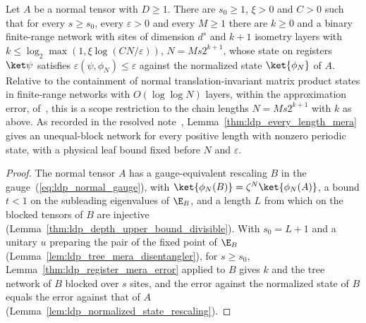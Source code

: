 \begin{lemma}
    \label{thm:ldp_normal_mps_mera}
    \leanok
    Let $A$ be a normal tensor with $D\ge1$. There are $s_0\ge1$, $\xi>0$
    and $C>0$ such that for every $s\ge s_0$, every $\varepsilon>0$ and every
    $M\ge1$ there are $k\ge0$ and a binary finite-range network with sites of
    dimension $d^s$ and $k+1$ isometry layers with
    $k\le\log_2\max(1,\xi\log(CN/\varepsilon))$, $N=Ms2^{k+1}$, whose state
    on registers $\ket\psi$ satisfies $\varepsilon(\psi,\phi_N)\le\varepsilon$
    against the normalized state $\ket{\phi_N}$ of $A$. Relative to the
    containment of normal translation-invariant matrix product states in
    finite-range networks with $O(\log\log N)$ layers, within the
    approximation error, of~\cite[paragraph ``Connection to
        MERA'']{Malz2024Preparation}, this is a scope restriction to the chain
    lengths $N=Ms2^{k+1}$ with $k$ as above.
    As recorded in the resolved note~\cite{gap:mswc24_tree_mera_scope},
    Lemma~\ref{thm:ldp_every_length_mera} gives an unequal-block network
    for every positive length with nonzero periodic state, with a physical
    leaf bound fixed before $N$ and $\varepsilon$.
\end{lemma}
\begin{proof}
    \leanok
    The normal tensor $A$ has a gauge-equivalent rescaling $B$ in the
    gauge~(\ref{eq:ldp_normal_gauge}), with
    $\ket{\phi_N(B)}=\zeta^N\ket{\phi_N(A)}$, a bound $t<1$ on the subleading
    eigenvalues of $\E_B$, and a length $L$ from which on the blocked
    tensors of $B$ are injective
    (Lemma~\ref{thm:ldp_depth_upper_bound_divisible}). With $s_0=L+1$ and
    a unitary $u$ preparing the pair of the fixed point of $\E_B$
    (Lemma~\ref{lem:ldp_tree_mera_disentangler}), for $s\ge s_0$,
    Lemma~\ref{thm:ldp_register_mera_error} applied to $B$ gives $k$ and
    the tree network of $B$ blocked over $s$ sites, and the error against
    the normalized state of $B$ equals the error against that of $A$
    (Lemma~\ref{lem:ldp_normalized_state_rescaling}).
\end{proof}

